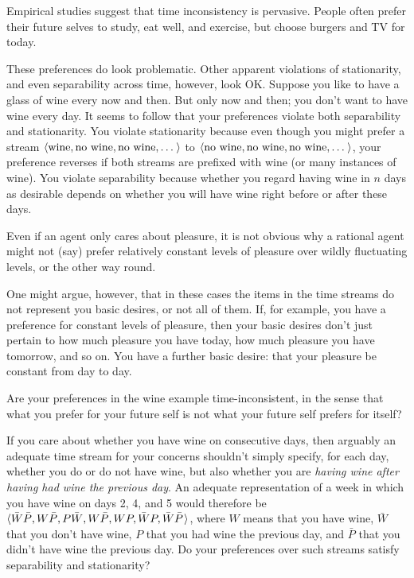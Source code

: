 

Empirical studies suggest that time inconsistency is pervasive. People often
prefer their future selves to study, eat well, and exercise, but choose burgers
and TV for today.

These preferences do look problematic. Other apparent violations of
stationarity, and even separability across time, however, look OK. Suppose you
like to have a glass of wine every now and then. But only now and then; you
don't want to have wine every day. It seems to follow that your preferences
violate both separability and stationarity. You violate stationarity because
even though you might prefer a stream $\t{\text{wine}, \text{no wine}, \text{no
    wine}, \ldots}$ to $\t{\text{no wine}, \text{no wine}, \text{no
    wine}, \ldots}$, your preference reverses if both streams are prefixed with
wine (or many instances of wine). You violate separability because whether you
regard having wine in $n$ days as desirable depends on whether you will have
wine right before or after these days.

Even if an agent only cares about pleasure, it is not obvious why a rational
agent might not (say) prefer relatively constant levels of pleasure over wildly
fluctuating levels, or the other way round.

One might argue, however, that in these cases the items in the time streams do
not represent you basic desires, or not all of them. If, for example, you have a
preference for constant levels of pleasure, then your basic desires don't just
pertain to how much pleasure you have today, how much pleasure you have
tomorrow, and so on. You have a further basic desire: that your pleasure be
constant from day to day.

\begin{exercise}{2}
  Are your preferences in the wine example time-inconsistent, in the sense that
  what you prefer for your future self is not what your future self prefers for
  itself?
\end{exercise}

\begin{exercise}{2}
  If you care about whether you have wine on consecutive days, then arguably an
  adequate time stream for your concerns shouldn't simply specify, for each day,
  whether you do or do not have wine, but also whether you are \emph{having wine
    after having had wine the previous day}. An adequate representation of a
  week in which you have wine on days 2, 4, and 5 would therefore be
  $\t{\bar{W} \bar{P}, W \bar{P}, P \bar{W}, W \bar{P}, W P, \bar{W} P, \bar{W} \bar{P}}$,
  where $W$ means that you have wine, $\bar{W}$ that you don't have wine, $P$
  that you had wine the previous day, and $\bar{P}$ that you didn't have wine
  the previous day. Do your preferences over such streams satisfy separability
  and stationarity?
\end{exercise}

